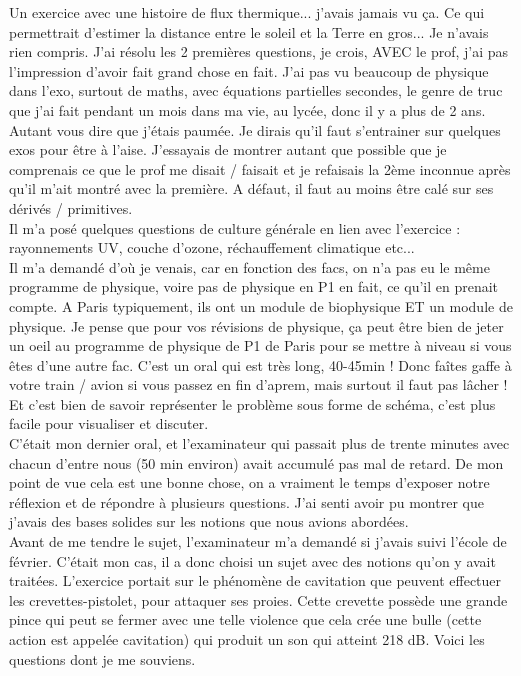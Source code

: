 \lettrine{{\color{yellow!80!black} \oldpilcrowfive}}{}
Un exercice avec une histoire de flux thermique... j’avais jamais vu ça. Ce qui permettrait d’estimer la distance entre le soleil et la Terre en gros... Je n’avais rien compris. J’ai résolu les 2 premières questions, je crois, AVEC le prof, j’ai pas l’impression d’avoir fait grand chose en fait. J’ai pas vu beaucoup de physique dans l’exo, surtout de maths, avec équations partielles secondes, le genre de truc que j’ai fait pendant un mois dans ma vie, au lycée, donc il y a plus de 2 ans. Autant vous dire que j’étais paumée. Je dirais qu’il faut s’entrainer sur quelques exos pour être à l’aise. J’essayais de montrer autant que possible que je comprenais ce que le prof me disait / faisait et je refaisais la 2ème inconnue après qu’il m’ait montré avec la première. A défaut, il faut au moins être calé sur ses dérivés / primitives.\\
Il m’a posé quelques questions de culture générale en lien avec l’exercice : rayonnements UV, couche d’ozone, réchauffement climatique etc...\\
Il m’a demandé d’où je venais, car en fonction des facs, on n’a pas eu le même programme de physique, voire pas de physique en P1 en fait, ce qu’il en prenait compte. A Paris typiquement, ils ont un module de biophysique ET un module de physique. Je pense que pour vos révisions de physique, ça peut être bien de jeter un oeil au programme de physique de P1 de Paris pour se mettre à niveau si vous êtes d’une autre fac. C’est un oral qui est très long, 40-45min ! Donc faîtes gaffe à votre train / avion si vous passez en fin d’aprem, mais surtout il faut pas lâcher !\\
Et c’est bien de savoir représenter le problème sous forme de schéma, c’est plus facile pour visualiser et discuter.\\

\lettrine{{\color{violet} \oldpilcrowfive}}{}
C’était mon dernier oral, et l’examinateur qui passait plus de trente minutes avec chacun d’entre nous (50 min environ) avait accumulé pas mal de retard. De mon point de vue cela est une bonne chose, on a vraiment le temps d’exposer notre réflexion et de répondre à plusieurs questions. J’ai senti avoir pu montrer que j’avais des bases solides sur les notions que nous avions abordées. \\

Avant de me tendre le sujet, l’examinateur m’a demandé si j’avais suivi l’école de février. C’était mon cas, il a donc choisi un sujet avec des notions qu’on y avait traitées. L’exercice portait sur le phénomène de cavitation que peuvent effectuer les crevettes-pistolet, pour attaquer ses proies.  Cette crevette possède une grande pince qui peut se fermer avec une telle violence que cela crée une bulle (cette action est appelée cavitation) qui produit un son qui atteint 218 dB. Voici les questions dont je me souviens.

